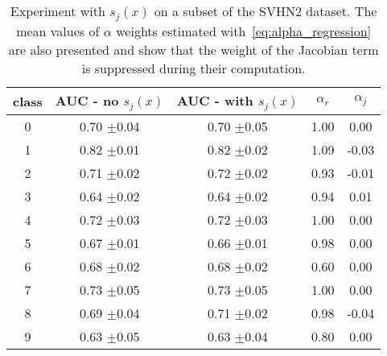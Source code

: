 \begin{table}[t] 
 \center 
 \begin{tabular}{c c c c c } 
 \toprule 
  class & AUC - no $s_j(x)$ & AUC - with $s_j(x)$ & $\alpha_r$ & $\alpha_j$  \\ 
  \midrule
  0 & 0.70 $\pm $0.04 & 0.70 $\pm $0.05 & 1.00 & 0.00  \\ 
  1 & 0.82 $\pm $0.01 & 0.82 $\pm $0.02 & 1.09 & -0.03  \\ 
  2 & 0.71 $\pm $0.02 & 0.72 $\pm $0.02 & 0.93 & -0.01  \\ 
  3 & 0.64 $\pm $0.02 & 0.64 $\pm $0.02 & 0.94 & 0.01  \\ 
  4 & 0.72 $\pm $0.03 & 0.72 $\pm $0.03 & 1.00 & 0.00  \\ 
  5 & 0.67 $\pm $0.01 & 0.66 $\pm $0.01 & 0.98 & 0.00  \\ 
  6 & 0.68 $\pm $0.02 & 0.68 $\pm $0.02 & 0.60 & 0.00  \\ 
  7 & 0.73 $\pm $0.05 & 0.73 $\pm $0.05 & 1.00 & 0.00  \\ 
  8 & 0.69 $\pm $0.04 & 0.71 $\pm $0.02 & 0.98 & -0.04  \\ 
  9 & 0.63 $\pm $0.05 & 0.63 $\pm $0.04 & 0.80 & 0.00  \\ 
  \bottomrule
 \end{tabular}
 \caption{Experiment with $s_j(x)$ on a subset of the SVHN2 dataset. The mean values of  $\alpha$ weights estimated with~\eqref{eq:alpha_regression} are also presented and show that the weight of the Jacobian term is suppressed during their computation.} 
 \label{tab:jacoceco_partial_experiment} 
\end{table}